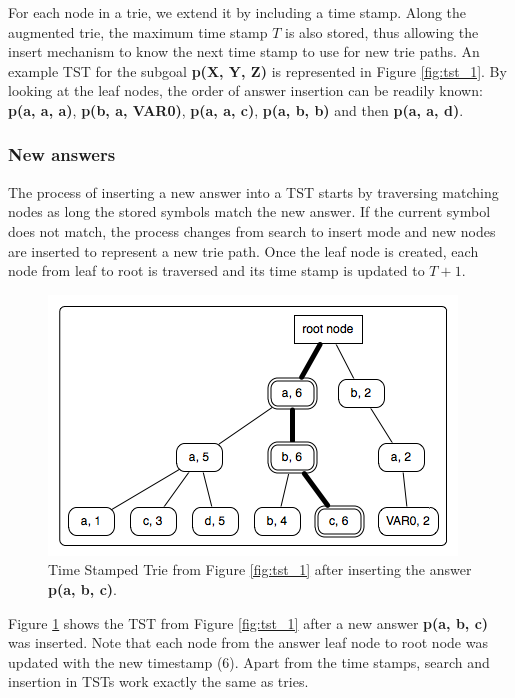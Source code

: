   For each node in a trie, we extend it by including a time stamp. Along the augmented trie, the maximum time stamp
  $T$ is also stored, thus allowing the insert mechanism to know the next time stamp to use for new trie paths.
  An example TST for the subgoal \textbf{p(X, Y, Z)} is represented in Figure \ref{fig:tst_1}.
  By looking at the leaf nodes, the order of answer insertion
  can be readily known: \textbf{p(a, a, a)}, \textbf{p(b, a, VAR0)}, \textbf{p(a, a, c)}, \textbf{p(a, b, b)} and then
  \textbf{p(a, a, d)}.
  
  \subsubsection{New answers}
  
  The process of inserting a new answer into a TST starts by traversing matching nodes as long the stored symbols
  match the new answer. If the current symbol does not match, the process changes from search to insert mode and
  new nodes are inserted to represent a new trie path. Once the leaf node is created, each node from leaf to root
  is traversed and its time stamp is updated to $T + 1$.
  
  \begin{figure}[ht]
    \centering
      \includegraphics[scale=0.6]{tst_2.png}
    \caption{Time Stamped Trie from Figure \ref{fig:tst_1} after inserting the answer \textbf{p(a, b, c)}.}
    \label{fig:tst_2}
  \end{figure}
  
  Figure \ref{fig:tst_2} shows the TST from Figure \ref{fig:tst_1} after a new answer \textbf{p(a, b, c)} was inserted.
  Note that each node from the answer leaf node to root node was updated with the new timestamp (6). Apart from
  the time stamps, search and insertion in TSTs work exactly the same as tries.
  
